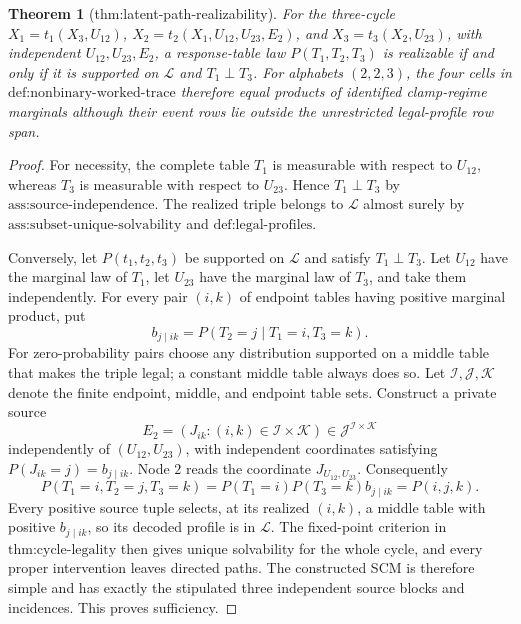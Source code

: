 \documentclass{article}
\newtheorem{theorem}{Theorem}
\begin{document}
\begin{theorem}[thm:latent-path-realizability]\label{thm:latent-path-realizability}
For the three-cycle \(X_1=t_1(X_3,U_{12})\), \(X_2=t_2(X_1,U_{12},U_{23},E_2)\), and \(X_3=t_3(X_2,U_{23})\), with independent \(U_{12},U_{23},E_2\), a response-table law \(P(T_1,T_2,T_3)\) is realizable if and only if it is supported on \(\mathcal L\) and \(T_1\perp T_3\). For alphabets \((2,2,3)\), the four cells in \(\text{def:nonbinary-worked-trace}\) therefore equal products of identified clamp-regime marginals although their event rows lie outside the unrestricted legal-profile row span.
\end{theorem}
\begin{proof}
For necessity, the complete table \(T_1\) is measurable with respect to \(U_{12}\), whereas \(T_3\) is measurable with respect to \(U_{23}\).  Hence \(T_1\perp T_3\) by \(\text{ass:source-independence}\).  The realized triple belongs to \(\mathcal L\) almost surely by \(\text{ass:subset-unique-solvability}\) and \(\text{def:legal-profiles}\).

Conversely, let \(P(t_1,t_2,t_3)\) be supported on \(\mathcal L\) and satisfy \(T_1\perp T_3\).  Let \(U_{12}\) have the marginal law of \(T_1\), let \(U_{23}\) have the marginal law of \(T_3\), and take them independently.  For every pair \((i,k)\) of endpoint tables having positive marginal product, put
\[
 b_{j\mid ik}=P(T_2=j\mid T_1=i,T_3=k).
\]
For zero-probability pairs choose any distribution supported on a middle table that makes the triple legal; a constant middle table always does so.  Let \(\mathcal I,\mathcal J,\mathcal K\) denote the finite endpoint, middle, and endpoint table sets.  Construct a private source
\[
 E_2=(J_{ik}:(i,k)\in\mathcal I\times\mathcal K)\in
 \mathcal J^{\mathcal I\times\mathcal K}
\]
independently of \((U_{12},U_{23})\), with independent coordinates satisfying \(P(J_{ik}=j)=b_{j\mid ik}\).  Node \(2\) reads the coordinate \(J_{U_{12},U_{23}}\).  Consequently
\[
 P(T_1=i,T_2=j,T_3=k)=P(T_1=i)P(T_3=k)b_{j\mid ik}=P(i,j,k).
\]
Every positive source tuple selects, at its realized \((i,k)\), a middle table with positive \(b_{j\mid ik}\), so its decoded profile is in \(\mathcal L\).  The fixed-point criterion in \(\text{thm:cycle-legality}\) then gives unique solvability for the whole cycle, and every proper intervention leaves directed paths.  The constructed SCM is therefore simple and has exactly the stipulated three independent source blocks and incidences.  This proves sufficiency.


\end{proof}
\end{document}
